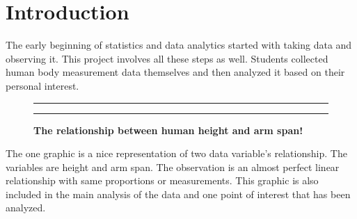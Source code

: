 \documentclass[]{article}
\begin{document}

\noindent  

\section{Introduction}
\label{sec:intro}

The early beginning of statistics and data analytics started with taking
data and observing it. This project involves all these steps as well.
Students collected human body measurement data themselves and then
analyzed it based on their personal interest.

\begin{figure}[!ht]
    \hrule
    \caption{ \textbf{The relationship between human height and arm span!} }
    \begin{center}
    \end{center}
    \label{fig:OneGraphic}
    \hrule
\end{figure}

The one graphic is a nice representation of two data variable's
relationship. The variables are height and arm span. The observation is
an almost perfect linear relationship with same proportions or
measurements. This graphic is also included in the main analysis of the
data and one point of interest that has been analyzed.
\end{document}
